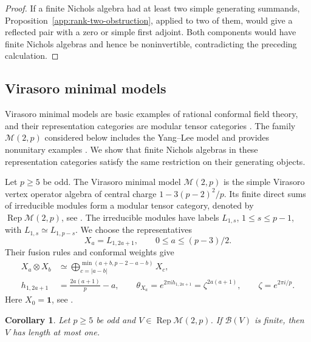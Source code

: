\documentclass[11pt, a4paper]{article}
\numberwithin{equation}{section}
\newcommand{\B}{\mathcal B}
\newcommand{\one}{\mathbf 1}
\newtheorem{corollary}[theorem]{Corollary}
\begin{document}
\begin{proof}
If a finite Nichols algebra had at least two simple generating
summands, Proposition~\ref{app:rank-two-obstruction}, applied
to two of them, would give a reflected pair with a zero or
simple first adjoint.
Both components would have finite Nichols algebras and hence
be noninvertible, contradicting the preceding calculation.
\end{proof}

\subsection{Virasoro minimal models}
\label{app:minimal-models}
{
Virasoro minimal models are basic examples of rational
conformal field theory, and their representation categories
are modular tensor categories
\cite[Section~2.2]{MS24}.
The family $\mathcal M(2,p)$ considered below includes the
Yang--Lee model and provides nonunitary examples
\cite[Section~5.2]{BD12}.
We show that finite Nichols algebras in these representation
categories satisfy the same restriction on their generating
objects.
}

Let $p\ge5$ be odd. The Virasoro minimal model $\mathcal M(2,p)$
is the simple Virasoro vertex operator algebra of central charge
$1-3(p-2)^2/p$. Its finite direct sums of irreducible modules form
a modular tensor category, denoted by
$\operatorname{Rep}\mathcal M(2,p)$, see
\cite[Section~2.2]{MS24}.
The irreducible modules have labels $L_{1,s}$, $1\le s\le p-1$,
with $L_{1,s}\simeq L_{1,p-s}$. We choose the representatives
\[
 X_a=L_{1,2a+1},\qquad 0\le a\le (p-3)/2.
\]
Their fusion rules and conformal weights give
\begin{align}
 X_a\otimes X_b
 &\simeq\bigoplus_{c=|a-b|}^{\min(a+b,p-2-a-b)}X_c,
 \label{app:minimal-fusion}\\
 h_{1,2a+1}&=\frac{2a(a+1)}p-a,
 \qquad
 \theta_{X_a}=e^{2\pi i h_{1,2a+1}}
             =\zeta^{2a(a+1)},\qquad \zeta=e^{2\pi i/p}.
 \label{app:minimal-twist}
\end{align}
Here  $X_0=\one$,
see \cite[Section~5.1]{BD12}.

\begin{corollary}\label{app:minimal}
Let $p\ge5$ be odd and
$V\in\operatorname{Rep}\mathcal M(2,p)$.
If $\B(V)$ is finite, then $V$ has length at most one.
\end{corollary}
\end{document}
